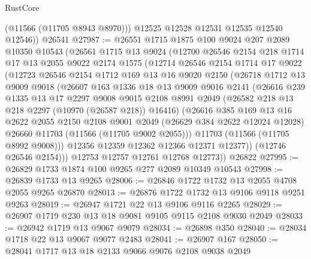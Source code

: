 \begin{lexlean}{RustCore}
\begin{coremodule}
          (@11566 (@11705 @8943 @8970)))
        @12525
        @12528
        @12531
        @12535
        @12540
        @12546))
    @26541
@27987 := @26551
    @1715
    @1875
    @100
    @9024
    @207
    @2089
    @10350
    @10543
    (@26561
      @1715
      @13
      @9024
      (@12700
        @26546
        @2154
        @218
        @1714
        @17
        @13
        @2055
        @9022
        @2174
        @1575
        (@12714
          @26546
          @2154
          @1714
          @17
          @9022
          (@12723
            @26546
            @2154
            @1712
            @169
            @13
            @16
            @9020
            @2150
            (@26718
              @1712
              @13
              @9009
              @9018
              (@26607
                @163
                @1336
                @18
                @13
                @9009
                @9016
                @2141
                (@26616
                  @239
                  @1335
                  @13
                  @17
                  @2297
                  @9008
                  @9015
                  @2108
                  @8991
                  @2049
                  (@26582 @218 @13 @218 @2297 (@10970 (@26587 @218)) @16416)
                  (@26616
                    @385
                    @169
                    @13
                    @16
                    @2622
                    @2055
                    @2150
                    @2108
                    @9001
                    @2049
                    (@26629 @384 @2622 @12024 @12028)
                    @26660
                    @11703
                    (@11566 (@11705 @9002 @2055)))
                  @11703
                  (@11566 (@11705 @8992 @9008)))
                @12356
                @12359
                @12362
                @12366
                @12371
                @12377))
            (@12746 @26546 @2154)))
        @12753
        @12757
        @12761
        @12768
        @12773))
    @26822
@27995 := @26829 @1733 @1874 @100 @9265 @277 @2089 @10349 @10543
@27998 := @26839 @1733 @13 @9265
@28006 := @26846 @1722 @1732 @13 @2055 @4708 @2055 @9265 @26870
@28013 := @26876 @1722 @1732 @13 @9106 @9118 @9251 @9263
@28019 := @26947 @1721 @22 @13 @9106 @9116 @2265
@28029 := @26907 @1719 @230 @13 @18 @9081 @9105 @9115 @2108 @9030 @2049
@28033 := @26942 @1719 @13 @9067 @9079
@28034 := @26898 @350
@28040 := @28034 @1718 @22 @13 @9067 @9077 @2483
@28041 := @26907 @167
@28050 := @28041 @1717 @13 @18 @2133 @9066 @9076 @2108 @9038 @2049

\end{coremodule}
\end{lexlean}

